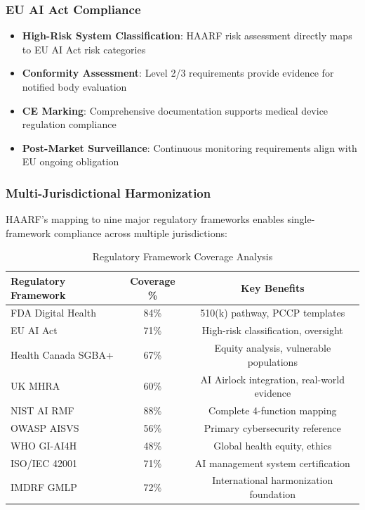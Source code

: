 \documentclass[11pt]{article}
\begin{document}
\subsubsection{EU AI Act Compliance}

\begin{itemize}
    \item \textbf{High-Risk System Classification}: HAARF risk assessment directly maps to EU AI Act risk categories
    \item \textbf{Conformity Assessment}: Level 2/3 requirements provide evidence for notified body evaluation
    \item \textbf{CE Marking}: Comprehensive documentation supports medical device regulation compliance
    \item \textbf{Post-Market Surveillance}: Continuous monitoring requirements align with EU ongoing obligation
\end{itemize}

\subsubsection{Multi-Jurisdictional Harmonization}

HAARF's mapping to nine major regulatory frameworks enables single-framework compliance across multiple jurisdictions:

\begin{table}[H]
\centering
\caption{Regulatory Framework Coverage Analysis}
\begin{tabular}{lcc}
\toprule
\textbf{Regulatory Framework} & \textbf{Coverage \%} & \textbf{Key Benefits} \\
\midrule
FDA Digital Health & 84\% & 510(k) pathway, PCCP templates \\
EU AI Act & 71\% & High-risk classification, oversight \\
Health Canada SGBA+ & 67\% & Equity analysis, vulnerable populations \\
UK MHRA & 60\% & AI Airlock integration, real-world evidence \\
NIST AI RMF & 88\% & Complete 4-function mapping \\
OWASP AISVS & 56\% & Primary cybersecurity reference \\
WHO GI-AI4H & 48\% & Global health equity, ethics \\
ISO/IEC 42001 & 71\% & AI management system certification \\
IMDRF GMLP & 72\% & International harmonization foundation \\
\bottomrule
\end{tabular}
\end{table}
\end{document}
